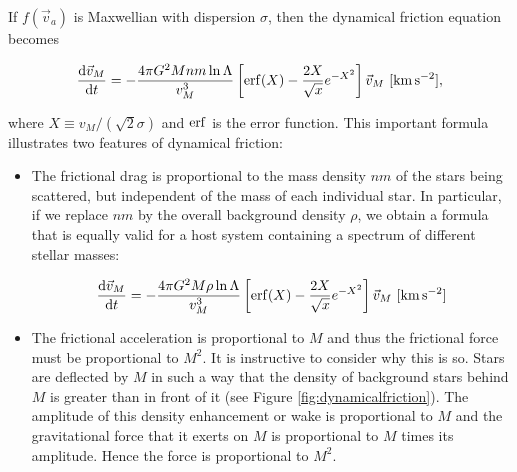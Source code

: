 \documentclass[a4paper,10pt]{article}
\begin{document}
{\noindent}If $f(\vec{v}_a)$ is Maxwellian with dispersion $\sigma$, then the dynamical friction equation becomes

\begin{align*}
    \frac{{\rm d}\vec{v}_M}{{\rm d}t} = -\frac{4\pi G^2Mnm\ln\Lambda}{v_M^3} \left[{\rm erf}(X)-\frac{2X}{\sqrt{x}} e^{-X^2}\right] \vec{v}_M ~ [{\rm km\,s^{-2}}],
\end{align*}

{\noindent}where $X\equiv v_M/(\sqrt{2}\sigma)$ and ${\rm erf}$ is the error function. This important formula illustrates two features of dynamical friction:

\begin{itemize}
    \item The frictional drag is proportional to the mass density $nm$ of the stars being scattered, but independent of the mass of each individual star. In particular, if we replace $nm$ by the overall background density $\rho$, we obtain a formula that is equally valid for a host system containing a spectrum of different stellar masses:
    
    \begin{align*}
        \frac{{\rm d}\vec{v}_M}{{\rm d}t} = -\frac{4\pi G^2M\rho\ln\Lambda}{v_M^3} \left[{\rm erf}(X)-\frac{2X}{\sqrt{x}} e^{-X^2}\right] \vec{v}_M ~ [{\rm km\,s^{-2}}]
    \end{align*}
    
    \item The frictional acceleration is proportional to $M$ and thus the frictional force must be proportional to $M^2$. It is instructive to consider why this is so. Stars are deflected by $M$ in such a way that the density of background stars behind $M$ is greater than in front of it (see Figure \ref{fig:dynamicalfriction}). The amplitude of this density enhancement or wake is proportional to $M$ and the gravitational force that it exerts on $M$ is proportional to $M$ times its amplitude. Hence the force is proportional to $M^2$.
\end{itemize}
\end{document}
